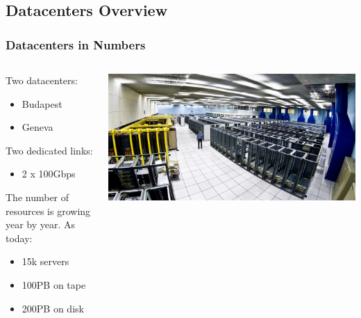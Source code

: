 \documentclass[aspectratio=169]{beamer}
\begin{document}

\subsection{Datacenters Overview}
\begin{frame}
    \frametitle{Datacenters in Numbers}
    \begin{minipage}[t]{0.95\textwidth}
        \begin{columns}[T]
            \begin{column}{0.5\textwidth}
                Two datacenters:
                \begin{itemize}
                    \item Budapest
                    \item Geneva
                \end{itemize}
                Two dedicated links:
                \begin{itemize}
                    \item 2 x 100Gbps
                \end{itemize}
                \vspace{0.1in} 
                The number of resources is growing year by year.
                As today:
                \begin{itemize}
                    \item 15k servers
                    \item 100PB on tape
                    \item 200PB on disk
                \end{itemize}
            \end{column}
            \begin{column}{0.5\textwidth}
                \vspace{0.2in} 
                \includegraphics[width=1.1\textwidth]{DC_overview.png}
            \end{column}
        \end{columns}
    \end{minipage}
\end{frame}
\end{document}
